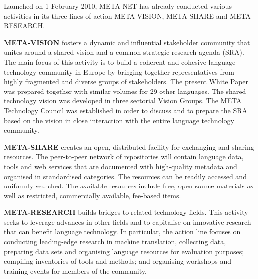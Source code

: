 \begin{multicols}{2}
Launched on 1 February 2010, META-NET has already conducted various activities in its three lines of action META-VISION, META-SHARE and META-RESEARCH.

\textbf{META-VISION} fosters a dynamic and influential stakeholder community that unites around a shared vision and a common strategic research agenda (SRA). The main focus of this activity is to build a coherent and cohesive language technology community in Europe by bringing together representatives from highly fragmented and diverse groups of stakeholders. The present White Paper was prepared together with similar volumes for 29 other languages. The shared technology vision was develo\-ped in three sectorial Vision Groups. The META Technology Council was established in order to discuss and to prepare the SRA based on the vision in close interaction with the entire language techno\-logy community.

\textbf{META-SHARE} creates an open, distributed faci\-lity for exchanging and sharing resources. The peer-to-peer network of repositories will contain language data, tools and web services that are documented with high-quality metadata and organised in standard\-ised categories. The resources can be readily accessed and uniformly searched. The avai\-lable resources include free, open source materials as well as restricted, commercially available, fee-based items.

\textbf{META-RESEARCH} builds bridges to related technology fields. This activity seeks to leverage advances in other fields and to capitalise on innovative research that can benefit language technology. In particular, the action line focuses on conducting leading-edge research in machine translation, collecting data, preparing data sets and organising language resources for evaluation purposes; compiling inventories of tools and methods; and organising workshops and training events for members of the community.

\end{multicols}

\cleardoublepage

\appendix
{}



  
\cleardoublepage

\label{metanetmembers}

